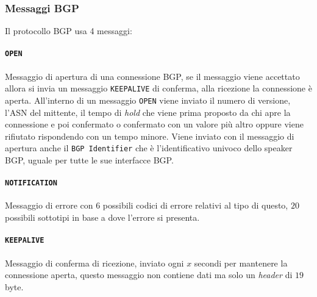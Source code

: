         \subsubsection{Messaggi \Acrshort*{BGP}}
            Il protocollo \Acrshort*{BGP} usa 4 messaggi:
            \paragraph{\texttt{OPEN}} Messaggio di apertura di una connessione \Acrshort*{BGP}, se il messaggio viene accettato allora si invia un messaggio \texttt{KEEPALIVE} di conferma, alla ricezione la connessione è aperta. All'interno di un messaggio \texttt{OPEN} viene inviato il numero di versione, l'\Acrshort*{ASN} del mittente, il tempo di \textit{hold} che viene prima proposto da chi apre la connessione e poi confermato o confermato con un valore più altro oppure viene rifiutato rispondendo con un tempo minore. Viene inviato con il messaggio di apertura anche il \texttt{BGP Identifier} che è l'identificativo univoco dello speaker \Acrshort*{BGP}, uguale per tutte le sue interfacce \Acrshort*{BGP}.
            \paragraph{\texttt{NOTIFICATION}} Messaggio di errore con $6$ possibili codici di errore relativi al tipo di questo, $20$ possibili sottotipi in base a dove l'errore si presenta. 
            \paragraph{\texttt{KEEPALIVE}} Messaggio di conferma di ricezione, inviato ogni $x$ secondi per mantenere la connessione aperta, questo messaggio non contiene dati ma solo un \textit{header} di $19$ byte.
